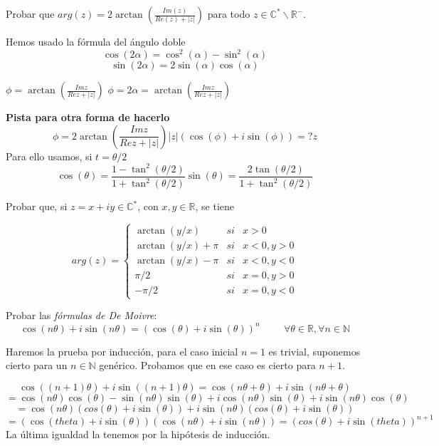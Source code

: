 \begin{ejer}
	Probar que $arg(z) = 2\arctan( \frac{Im(z)}{Re(z) + |z|} )$ para todo  $z\in\mathbb{C}^{\ast}\backslash\mathbb{R}^{-}$.
\end{ejer}

\begin{sol}

Hemos usado la fórmula del ángulo doble
$$ \cos(2\alpha) = \cos^2(\alpha)-\sin^2(\alpha) $$
$$ \sin(2\alpha) = 2\sin(\alpha)\cos(\alpha) $$

$\phi = \arctan(\frac{Im z}{Re z + |z|})$
$\phi = 2\alpha = \arctan(\frac{Im z}{Re z + |z|}) $

\textbf{Pista para otra forma de hacerlo}
$$ \phi = 2\arctan ( \frac{Im z}{Re z + |z|} ) 
|z|(\cos(\phi)+i\sin(\phi)) =? z $$
Para ello usamos, si $t=\theta/2$
$$ \cos(\theta) = \frac{1-\tan^2(\theta/2)}{1+\tan^2(\theta/2)}
\sin(\theta) = \frac{2\tan(\theta/2)}{1+\tan^2(\theta/2)} $$
\end{sol}


\begin{ejer}
	Probar que, si $z=x+iy\in\mathbb{C}^{\ast}$, con $x,y\in\mathbb{R}$, se tiene
	
	$$
	arg(z) = \left\{ 
		\begin{array}{lcc}
			\arctan(y/x) &   si  & x>0 \\
			\arctan(y/x) + \pi & si & x<0, y>0 \\
			\arctan(y/x)-\pi & si & x<0,y<0 \\
			\pi/2 & si & x=0,y>0 \\
			-\pi/2 & si & x=0,y<0 
		\end{array}
	\right.
	$$
\end{ejer}


\begin{ejer}
	Probar las \textit{fórmulas de De Moivre}:
	$$ \cos(n\theta) + i\sin(n\theta) = (\cos(\theta)+i\sin(\theta))^n \hspace{1cm}\forall\theta\in\mathbb{R}, \forall n\in\mathbb{N} $$
\end{ejer}


\begin{sol}
Haremos la prueba por inducción, para el caso inicial $n=1$ es trivial, suponemos cierto para un $n\in\mathbb{N}$ genérico.
Probamos que en ese caso es cierto para $n+1$.

$$ 
\cos((n+1)\theta)+i\sin((n+1)\theta) 
=
\cos(n\theta+\theta)+i\sin(n\theta+\theta)
$$
$$ =
\cos(n\theta) \cos(\theta)- \sin(n\theta)\sin(\theta) +i\cos(n\theta)\sin(\theta) + i\sin(n\theta)\cos(\theta) $$
$$ =
\cos(n\theta)(cos(\theta)+i\sin(\theta)) + i\sin(n\theta)(cos(\theta)+i\sin(\theta))
$$
$$=
(\cos(theta)+i\sin(\theta)) (\cos(n\theta)+i\sin(n\theta))
=
(cos(\theta)+i\sin(theta))^{n+1}
$$
La última igualdad la tenemos por la hipótesis de inducción.
\end{sol}



